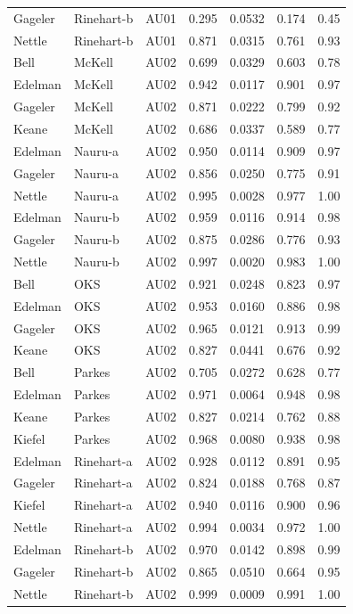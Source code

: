 \documentclass{monashthesis}
\begin{document}
\begin{center}
\begin{longtable}{lllllll}
Gageler & Rinehart-b & AU01 & 0.295 & 0.0532 & 0.174 & 0.45 \\
Nettle & Rinehart-b & AU01 & 0.871 & 0.0315 & 0.761 & 0.93 \\
Bell & McKell & AU02 & 0.699 & 0.0329 & 0.603 & 0.78 \\
Edelman & McKell & AU02 & 0.942 & 0.0117 & 0.901 & 0.97 \\
Gageler & McKell & AU02 & 0.871 & 0.0222 & 0.799 & 0.92 \\
Keane & McKell & AU02 & 0.686 & 0.0337 & 0.589 & 0.77 \\
Edelman & Nauru-a & AU02 & 0.950 & 0.0114 & 0.909 & 0.97 \\
Gageler & Nauru-a & AU02 & 0.856 & 0.0250 & 0.775 & 0.91 \\
Nettle & Nauru-a & AU02 & 0.995 & 0.0028 & 0.977 & 1.00 \\
Edelman & Nauru-b & AU02 & 0.959 & 0.0116 & 0.914 & 0.98 \\
Gageler & Nauru-b & AU02 & 0.875 & 0.0286 & 0.776 & 0.93 \\
Nettle & Nauru-b & AU02 & 0.997 & 0.0020 & 0.983 & 1.00 \\
Bell & OKS & AU02 & 0.921 & 0.0248 & 0.823 & 0.97 \\
Edelman & OKS & AU02 & 0.953 & 0.0160 & 0.886 & 0.98 \\
Gageler & OKS & AU02 & 0.965 & 0.0121 & 0.913 & 0.99 \\
Keane & OKS & AU02 & 0.827 & 0.0441 & 0.676 & 0.92 \\
Bell & Parkes & AU02 & 0.705 & 0.0272 & 0.628 & 0.77 \\
Edelman & Parkes & AU02 & 0.971 & 0.0064 & 0.948 & 0.98 \\
Keane & Parkes & AU02 & 0.827 & 0.0214 & 0.762 & 0.88 \\
Kiefel & Parkes & AU02 & 0.968 & 0.0080 & 0.938 & 0.98 \\
Edelman & Rinehart-a & AU02 & 0.928 & 0.0112 & 0.891 & 0.95 \\
Gageler & Rinehart-a & AU02 & 0.824 & 0.0188 & 0.768 & 0.87 \\
Kiefel & Rinehart-a & AU02 & 0.940 & 0.0116 & 0.900 & 0.96 \\
Nettle & Rinehart-a & AU02 & 0.994 & 0.0034 & 0.972 & 1.00 \\
Edelman & Rinehart-b & AU02 & 0.970 & 0.0142 & 0.898 & 0.99 \\
Gageler & Rinehart-b & AU02 & 0.865 & 0.0510 & 0.664 & 0.95 \\
Nettle & Rinehart-b & AU02 & 0.999 & 0.0009 & 0.991 & 1.00 \\

\end{longtable}
\end{center}
\end{document}
